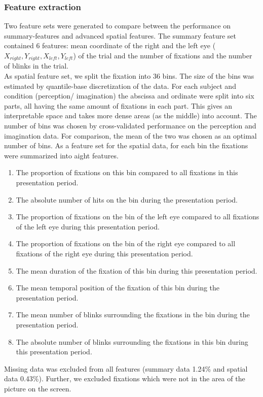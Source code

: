 \documentclass[a4paper,man,natbib,floatsintext]{apa6}
\begin{document}
\subsubsection{Feature extraction}
Two feature sets were generated to compare between the performance on summary-features and advanced spatial features. 
The summary feature set contained 6 features: mean coordinate of the right and the left eye ($X_{right}, Y_{right}, X_{left}, Y_{left}$) of the trial and the number of fixations and the number of blinks in the trial. \\
As spatial feature set, we split the fixation into 36 bins. The size of the bins was estimated by quantile-base discretization of the data. For each subject and condition (perception/ imagination) the abscissa and ordinate were split into six parts, all having the same amount of fixations in each part. This gives an interpretable space and takes more dense areas (as the middle) into account. The number of bins was chosen by cross-validated performance on the perception and imagination data. For comparison, the mean of the two was chosen as an optimal number of bins. %
As a feature set for the spatial data, for each bin the fixations were summarized into aight features. 
 \begin{enumerate}
\item The proportion of fixations on this bin compared to all fixations in this presentation period. 
\item The absolute number of hits on the bin during the presentation period.
\item The proportion of fixations on the bin of the left eye compared to all fixations of the left eye during this presentation period.
\item The proportion of fixations on the bin of the right eye compared to all fixations of the right eye during this presentation period. 
\item The mean duration of the fixation of this bin during this presentation period.
\item The mean temporal position of the fixation of this bin during the presentation period.
\item The mean number of blinks surrounding the fixations in the bin during the presentation period.
\item The absolute number of blinks surrounding the fixations in this bin during this presentation period.
\end{enumerate}
Missing data was excluded from all features (summary data 1.24\% and spatial data 0.43\%). Further, we excluded fixations which were not in the area of the picture on the screen. \\
\end{document}

